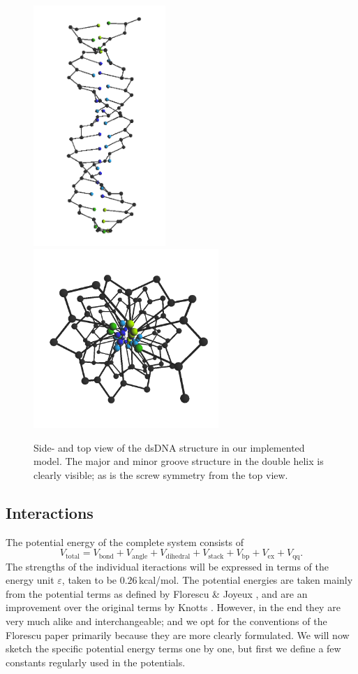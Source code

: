 \begin{figure}[h]
\begin{center}
\includegraphics[width=5cm]{images/methods_dnaStructure1} \includegraphics[width=7cm]{images/methods_dnaStructure2}

\end{center}\label{methods_dnaStructure}
\caption{Side- and top view of the dsDNA structure in our implemented model. The major and minor groove structure in the double helix is clearly visible; as is the screw symmetry from the top view.}
\end{figure}


\subsection{Interactions}

The potential energy of the complete system consists of
\begin{equation}
V_\text{total} = V_\text{bond} + V_\text{angle} + V_\text{dihedral} + V_\text{stack} + V_\text{bp} + V_\text{ex} + V_\text{qq}.
\end{equation}
The strengths of the individual iteractions will be expressed in terms of the energy unit $\varepsilon$, taken to be $0.26$\,kcal/mol. The potential energies are taken mainly from the potential terms as defined by Florescu \& Joyeux \cite{florescu2011thermal}, and are an improvement over the original terms by Knotts \etal \cite{knotts2007coarse}. However, in the end they are very much alike and interchangeable; and we opt for the conventions of the Florescu paper primarily because they are more clearly formulated. We will now sketch the specific potential energy terms one by one, but first we define a few constants regularly used in the potentials.

